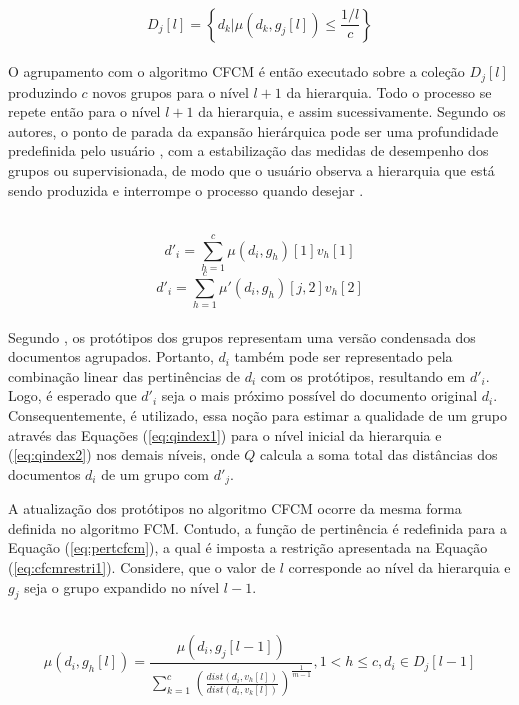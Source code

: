 \leavevmode\\
\begin{equation}
  D_j[l] = \left\{d_{k} | \mu(d_{k}, g_j[l]) \leq \frac{1/l}{c}\right\}
  \label{eq:cfcmfilter}
\end{equation}
\leavevmode\\

O agrupamento com o algoritmo CFCM é então executado sobre a coleção $D_j[l]$ produzindo $c$ novos
grupos para o nível $l+1$ da hierarquia. Todo o processo se repete então para o nível $l+1$ da
hierarquia, e assim sucessivamente. Segundo os autores, o ponto de parada da expansão hierárquica
pode ser uma profundidade predefinida pelo usuário , com a estabilização das medidas de desempenho
dos grupos ou supervisionada, de modo que o usuário observa a hierarquia que está sendo produzida e
interrompe o processo quando desejar \cite{PedryczR2006}.

\leavevmode\\
\begin{equation}
  d'_i = \sum_{h=1}^c \mu(d_i,g_h)[1]v_h[1] 
  \label{eq:dlinha1}
\end{equation}
\begin{equation}
  d'_i = \sum_{h=1}^c \mu'(d_i,g_h)[j,2]v_h[2] 
  \label{eq:dlinha2}
\end{equation}
\leavevmode\\

Segundo , os protótipos dos grupos representam uma versão condensada dos
documentos agrupados. Portanto, $d_i$ também pode ser representado pela combinação linear das
pertinências de $d_i$ com os protótipos, resultando em $d'_i$. Logo, é esperado que $d'_i$ seja o
mais próximo possível do documento original $d_i$. Consequentemente, é utilizado, essa noção para
estimar a qualidade de um grupo através das Equações (\ref{eq:qindex1}) para o nível inicial da
hierarquia e (\ref{eq:qindex2}) nos demais níveis, onde $Q$ calcula a soma total das distâncias dos
documentos $d_i$ de um grupo com $d'_j$.

A atualização dos protótipos no algoritmo CFCM ocorre da mesma forma definida no algoritmo FCM.
Contudo, a função de pertinência é redefinida para a Equação (\ref{eq:pertcfcm}), a qual é imposta a
restrição apresentada na Equação (\ref{eq:cfcmrestri1}). Considere, que o valor de $l$ corresponde
ao nível da hierarquia e $g_j$ seja o grupo expandido no nível $l-1$.

\leavevmode\\
\begin{equation}
  \mu(d_i,g_h[l]) = \frac{\mu(d_i,g_j[l-1])}
  {\sum_{k=1}^c \left(\frac{dist(d_i,v_h[l])}{dist(d_i,v_k[l])}\right)^{\frac{1}{m-1}}}, 
  1 < h \leq c,
  d_i \in D_j[l-1]
  \label{eq:pertcfcm}
\end{equation}
\leavevmode\\

